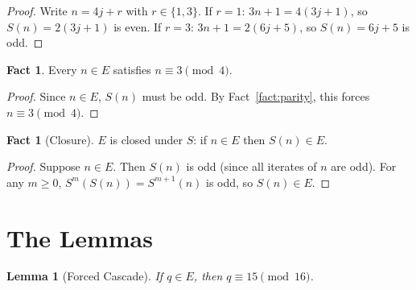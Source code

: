 \documentclass{amsart}
\newtheorem{lemma}[theorem]{Lemma}
\theoremstyle{definition}
\newtheorem{fact}[theorem]{Fact}
\theoremstyle{remark}
\begin{document}
\begin{proof}
Write $n=4j+r$ with $r\in\{1,3\}$.
If $r=1$: $3n+1=4(3j+1)$, so $S(n)=2(3j+1)$ is even.
If $r=3$: $3n+1=2(6j+5)$, so $S(n)=6j+5$ is odd.
\end{proof}

\begin{fact}
\label{fact:E3mod4}
Every $n\in E$ satisfies $n\equiv 3\pmod{4}$.
\end{fact}

\begin{proof}
Since $n\in E$, $S(n)$ must be odd.
By Fact~\ref{fact:parity}, this forces $n\equiv 3\pmod{4}$.
\end{proof}

\begin{fact}[Closure]
\label{fact:closure}
$E$ is closed under $S$: if $n\in E$ then $S(n)\in E$.
\end{fact}

\begin{proof}
Suppose $n\in E$.
Then $S(n)$ is odd (since all iterates of $n$ are odd).
For any $m\ge 0$, $S^m(S(n))=S^{m+1}(n)$ is odd, so $S(n)\in E$.
\end{proof}

\section{The Lemmas}
\label{sec:lemmas}

\begin{lemma}[Forced Cascade]
\label{lem:cascade}
If $q\in E$, then $q\equiv 15\pmod{16}$.
\end{lemma}
\end{document}
